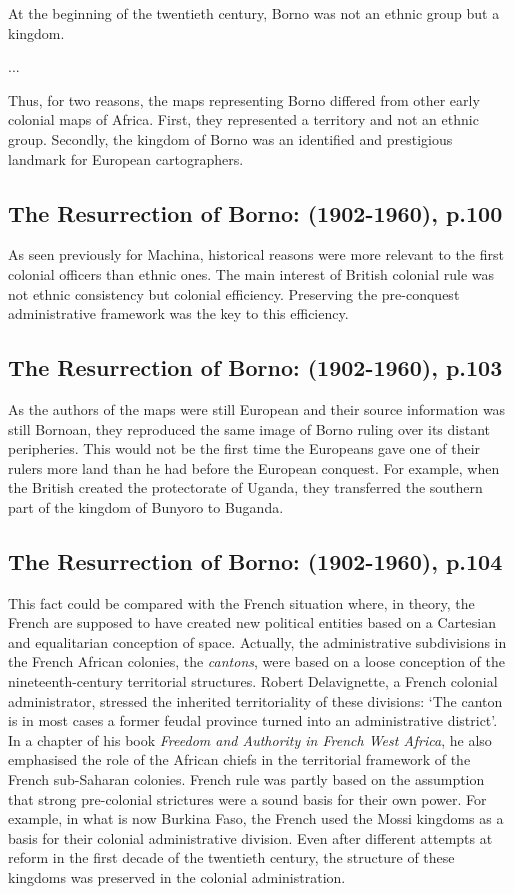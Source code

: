 \documentclass[12pt]{article}
\begin{document}
At the beginning of the twentieth century, Borno was not an ethnic group but a
kingdom. 

...

Thus, for two reasons, the maps representing Borno differed from other early colonial
maps of Africa. First, they represented a territory and not an ethnic group.
Secondly, the kingdom of Borno was an identified and prestigious landmark for
European cartographers.

\subsection{The Resurrection of Borno: (1902-1960), p.100}

As seen previously for Machina, historical reasons were more relevant to the
first colonial officers than ethnic ones. The main interest of British colonial
rule was not ethnic consistency but colonial efficiency. Preserving the
pre-conquest administrative framework was the key to this efficiency.

\subsection{The Resurrection of Borno: (1902-1960), p.103}

As the authors of the maps were still European and their source information was
still Bornoan, they reproduced the same image of Borno ruling over its distant
peripheries. This would not be the first time the Europeans gave one of their
rulers more land than he had before the European conquest. For example, when the
British created the protectorate of Uganda, they transferred the southern part
of the kingdom of Bunyoro to Buganda.

\subsection{The Resurrection of Borno: (1902-1960), p.104}

This fact could be compared with the French situation where, in theory, the
French are supposed to have created new political entities based on a Cartesian
and equalitarian conception of space. Actually, the administrative subdivisions
in the French African colonies, the \textit{cantons}, were based on a loose
conception of the nineteenth-century territorial structures. Robert
Delavignette, a French colonial administrator, stressed the inherited
territoriality of these divisions: `The canton is in most cases a former feudal
province turned into an administrative district'. In a chapter of his book
\textit{Freedom and Authority in French West Africa}, he also emphasised the
role of the African chiefs in the territorial framework of the French
sub-Saharan colonies. French rule was partly based on the assumption that strong
pre-colonial strictures were a sound basis for their own power. For example, in
what is now Burkina Faso, the French used the Mossi kingdoms as a basis for
their colonial administrative division. Even after different attempts at reform
in the first decade of the twentieth century, the structure of these kingdoms
was preserved in the colonial administration.
\end{document}
